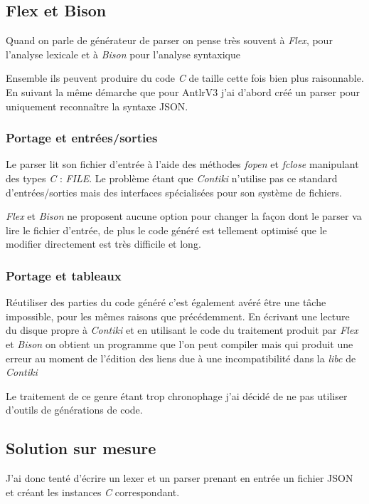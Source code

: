 \subsection{Flex et Bison}
Quand on parle de générateur de parser on pense très souvent à \emph{Flex}\cite{flex}, pour l'analyse lexicale et à \emph{Bison}\cite{bison} pour l'analyse syntaxique

Ensemble ils peuvent produire du code \emph{C} de taille cette fois bien plus raisonnable. En suivant la même démarche que pour AntlrV3 j'ai d'abord créé un parser pour uniquement reconnaître la syntaxe JSON.

\subsubsection{Portage et entrées/sorties}

Le parser lit son fichier d'entrée à l'aide des méthodes \emph{fopen} et \emph{fclose} manipulant des types \emph{C} : \emph{FILE}. Le problème étant que \emph{Contiki} n'utilise pas ce standard d'entrées/sorties mais des interfaces spécialisées pour son système de fichiers.

\emph{Flex} et \emph{Bison} ne proposent aucune option pour changer la façon dont le parser va lire le fichier d'entrée, de plus le code généré est tellement optimisé que le modifier directement est très difficile et long.

\subsubsection{Portage et tableaux}

Réutiliser des parties du code généré c'est également avéré être une tâche impossible, pour les mêmes raisons que précédemment. En écrivant une lecture du disque propre à \emph{Contiki} et en utilisant le code du traitement produit par \emph{Flex} et \emph{Bison} on obtient un programme que l'on peut compiler mais qui produit une erreur au moment de l'édition des liens due à une incompatibilité dans la \emph{libc} de \emph{Contiki}

Le traitement de ce genre étant trop chronophage j'ai décidé de ne pas utiliser d'outils de générations de code.

\subsection{Solution sur mesure}

J'ai donc tenté d'écrire un lexer et un parser prenant en entrée un fichier JSON et créant les instances \emph{C} correspondant.

